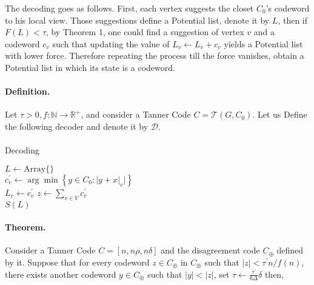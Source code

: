 \documentclass[sigplan,screen]{acmart}
\begin{document}
\begin{multicols*}{2}
  The decoding goes as follows. First, each vertex suggests the closet $C_{0}$'s codeword to his local view. Those suggestions define a Potential list, denote it by $L$, then if $F\left( L \right) <\tau$, by Theorem 1, one could find a suggestion of vertex $v$ and a codeword $c_v$ such that updating the value of $L_{v} \leftarrow L_{v} + c_{v}$ yields a Potential list with lower force. Therefore repeating the process till the force vanishes, obtain a Potential list in which its state is a codeword. 
  \paragraph{Definition.} Let $\tau > 0, f : \mathbb{N} \rightarrow \mathbb{R^{+}}$, and consider a Tanner Code $C = \mathcal{T}\left( G, C_{0} \right)$. Let us Define the following decoder and denote it by $\mathcal{D}$.  
  \paragraph{}
  \begin{algorithm}[H]
    \caption{Decoding}
    \label{alg:three}
    $ L \leftarrow \text{Array} \{ \} $\\
     {
      $c^{\prime}_{v} \leftarrow \arg\min {\left\{  y \in C_{0} : |y + x|_{v} |  \right\} } $\\
      $ L_{v} \leftarrow c^{\prime}_{v}$
    }
    $ z \leftarrow \sum_{v \in V}{c^{\prime}_{v}} $\\
    \Return  $S(L) $

  \end{algorithm}

  \paragraph{Theorem.} Consider a Tanner Code $C = [n, n\rho, n\delta]$ and the disagreement code $C_{\oplus}$ defined by it. Suppose that for every codeword $ z \in C_{\oplus}$ in $C_{\oplus}$ such that $|z| < \tau^{\prime} n / f\left(n\right)$, there exists another codeword $y \in C_{\oplus} $ such that $|y| < |z|$, set $\tau \leftarrow \frac{\tau^{\prime} }{6 \Delta} \delta$ then, 


\end{multicols*}
\end{document}
